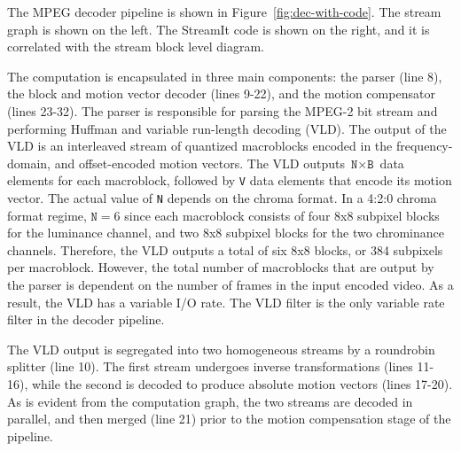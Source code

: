 
The MPEG decoder pipeline is shown in
Figure~\ref{fig:dec-with-code}. The stream graph is shown on the
left. The StreamIt code is shown on the right, and it is correlated
with the stream block level diagram.

The computation is encapsulated in three main components:
the parser (line 8), the block and motion vector decoder (lines 9-22),
and the motion compensator (lines 23-32).
The parser is responsible for parsing the MPEG-2 bit stream and
performing Huffman and variable run-length decoding (VLD). The output
of the VLD is an interleaved stream of quantized macroblocks encoded
in the frequency-domain, and offset-encoded motion vectors. The VLD
outputs $\texttt{N}\times\texttt{B}$ data elements for each
macroblock, followed by \texttt{V} data elements that encode its
motion vector. The actual value of \texttt{N} depends on the chroma
format. In a 4:2:0 chroma format regime, $\texttt{N}=6$ since each
macroblock consists of four 8x8 subpixel blocks for the luminance
channel, and two 8x8 subpixel blocks for the two chrominance
channels. Therefore, the VLD outputs a total of six 8x8 blocks, or 384
subpixels per macroblock. However, the total number of macroblocks
that are output by the parser is dependent on the number of frames in
the input encoded video. As a result, the VLD has a variable I/O
rate. The VLD filter is the only variable rate filter in the decoder
pipeline.

The VLD output is segregated into two homogeneous streams by a
roundrobin splitter (line 10). The first stream undergoes inverse
transformations (lines 11-16), while the second is decoded to produce
absolute motion vectors (lines 17-20). As is evident from the computation
graph, the two streams are decoded in parallel, and then merged (line
21) prior to the motion compensation stage of the pipeline.

